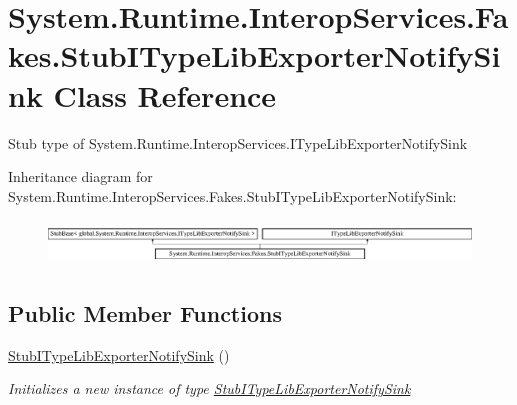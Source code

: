 \hypertarget{class_system_1_1_runtime_1_1_interop_services_1_1_fakes_1_1_stub_i_type_lib_exporter_notify_sink}{\section{System.\-Runtime.\-Interop\-Services.\-Fakes.\-Stub\-I\-Type\-Lib\-Exporter\-Notify\-Sink Class Reference}
\label{class_system_1_1_runtime_1_1_interop_services_1_1_fakes_1_1_stub_i_type_lib_exporter_notify_sink}
}


Stub type of System.\-Runtime.\-Interop\-Services.\-I\-Type\-Lib\-Exporter\-Notify\-Sink 


Inheritance diagram for System.\-Runtime.\-Interop\-Services.\-Fakes.\-Stub\-I\-Type\-Lib\-Exporter\-Notify\-Sink\-:\begin{figure}[H]
\begin{center}
\leavevmode
\includegraphics[height=1.183932cm]{class_system_1_1_runtime_1_1_interop_services_1_1_fakes_1_1_stub_i_type_lib_exporter_notify_sink}
\end{center}
\end{figure}
\subsection*{Public Member Functions}
\begin{DoxyCompactItemize}
\item 
\hyperlink{class_system_1_1_runtime_1_1_interop_services_1_1_fakes_1_1_stub_i_type_lib_exporter_notify_sink_a8b90b9d37843a9fdddb5d6acb2d50929}{Stub\-I\-Type\-Lib\-Exporter\-Notify\-Sink} ()
\begin{DoxyCompactList}\small\item\em Initializes a new instance of type \hyperlink{class_system_1_1_runtime_1_1_interop_services_1_1_fakes_1_1_stub_i_type_lib_exporter_notify_sink}{Stub\-I\-Type\-Lib\-Exporter\-Notify\-Sink}\end{DoxyCompactList}\end{DoxyCompactItemize}
